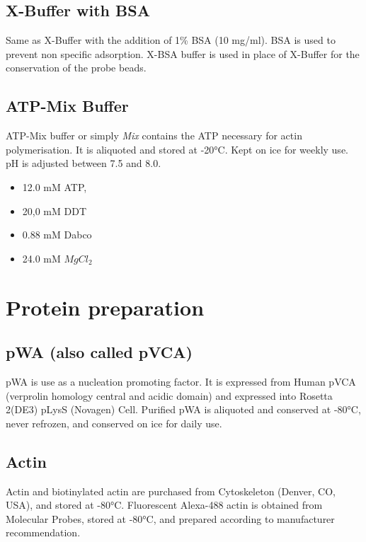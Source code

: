 \documentclass[A4paperpaper,11pt,english]{sphinxmanual}
\begin{document}
\subsection{X-Buffer with BSA}
\label{index-latex:x-buffer-with-bsa}
Same as X-Buffer with the addition of 1\% BSA (10 mg/ml). BSA is used to prevent
non specific adsorption. X-BSA buffer is used  in place of X-Buffer for
the conservation of the probe beads.


\subsection{ATP-Mix Buffer}
\label{index-latex:atp-mix-buffer}\label{index-latex:id1}
ATP-Mix buffer or simply \emph{Mix} contains the ATP necessary for actin
polymerisation. It is aliquoted and stored at -20°C. Kept on ice for weekly use. pH is adjusted between 7.5 and 8.0.
\begin{itemize}
\item {} 
12.0 mM ATP,

\item {} 
20,0 mM DDT

\item {} 
0.88 mM Dabco

\item {} 
24.0 mM \(MgCl_2\)

\end{itemize}


\section{Protein preparation}
\label{index-latex:protein-preparation}

\subsection{pWA (also called pVCA)}
\label{index-latex:pwa-also-called-pvca}
pWA is use as a nucleation promoting factor. It is expressed from Human pVCA
(verprolin homology central and acidic domain) and expressed into Rosetta
2(DE3) pLysS (Novagen) Cell.  Purified pWA is aliquoted and conserved at -80°C, never
refrozen, and conserved on ice for daily use.


\subsection{Actin}
\label{index-latex:actin}
Actin and biotinylated actin are purchased from Cytoskeleton (Denver, CO, USA), and stored at -80°C.
Fluorescent Alexa-488 actin is obtained from Molecular Probes, stored at -80°C, and prepared according to manufacturer recommendation.
\end{document}
